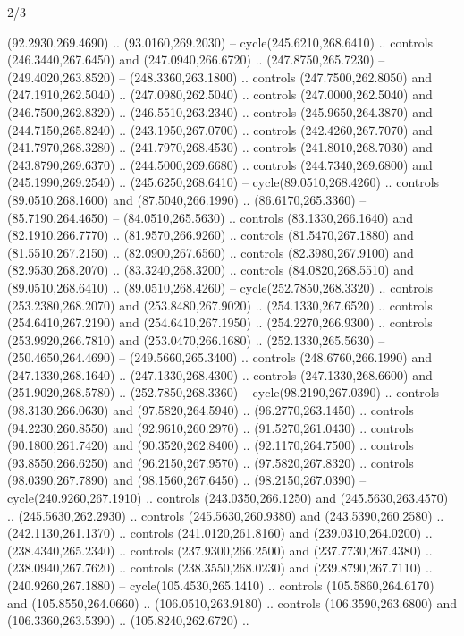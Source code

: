 \begin{flagdescription}{2/3}
\begin{scope}[xshift=0.5\flaglength,yshift=0.5\flagwidth,scale=\stretchfactor]
\begin{scope}[scale=0.001645\flagwidth,yshift=65mm,xshift=-63mm]
\begin{scope}[y=0.80pt, x=0.80pt, yscale=-1,]
\begin{scope}[cm={{1.33333,0.0,0.0,1.33333,(0.0,1e-05)}}]
  (92.2930,269.4690) .. (93.0160,269.2030) -- cycle(245.6210,268.6410) ..
  controls (246.3440,267.6450) and (247.0940,266.6720) .. (247.8750,265.7230) --
  (249.4020,263.8520) -- (248.3360,263.1800) .. controls (247.7500,262.8050) and
  (247.1910,262.5040) .. (247.0980,262.5040) .. controls (247.0000,262.5040) and
  (246.7500,262.8320) .. (246.5510,263.2340) .. controls (245.9650,264.3870) and
  (244.7150,265.8240) .. (243.1950,267.0700) .. controls (242.4260,267.7070) and
  (241.7970,268.3280) .. (241.7970,268.4530) .. controls (241.8010,268.7030) and
  (243.8790,269.6370) .. (244.5000,269.6680) .. controls (244.7340,269.6800) and
  (245.1990,269.2540) .. (245.6250,268.6410) -- cycle(89.0510,268.4260) ..
  controls (89.0510,268.1600) and (87.5040,266.1990) .. (86.6170,265.3360) --
  (85.7190,264.4650) -- (84.0510,265.5630) .. controls (83.1330,266.1640) and
  (82.1910,266.7770) .. (81.9570,266.9260) .. controls (81.5470,267.1880) and
  (81.5510,267.2150) .. (82.0900,267.6560) .. controls (82.3980,267.9100) and
  (82.9530,268.2070) .. (83.3240,268.3200) .. controls (84.0820,268.5510) and
  (89.0510,268.6410) .. (89.0510,268.4260) -- cycle(252.7850,268.3320) ..
  controls (253.2380,268.2070) and (253.8480,267.9020) .. (254.1330,267.6520) ..
  controls (254.6410,267.2190) and (254.6410,267.1950) .. (254.2270,266.9300) ..
  controls (253.9920,266.7810) and (253.0470,266.1680) .. (252.1330,265.5630) --
  (250.4650,264.4690) -- (249.5660,265.3400) .. controls (248.6760,266.1990) and
  (247.1330,268.1640) .. (247.1330,268.4300) .. controls (247.1330,268.6600) and
  (251.9020,268.5780) .. (252.7850,268.3360) -- cycle(98.2190,267.0390) ..
  controls (98.3130,266.0630) and (97.5820,264.5940) .. (96.2770,263.1450) ..
  controls (94.2230,260.8550) and (92.9610,260.2970) .. (91.5270,261.0430) ..
  controls (90.1800,261.7420) and (90.3520,262.8400) .. (92.1170,264.7500) ..
  controls (93.8550,266.6250) and (96.2150,267.9570) .. (97.5820,267.8320) ..
  controls (98.0390,267.7890) and (98.1560,267.6450) .. (98.2150,267.0390) --
  cycle(240.9260,267.1910) .. controls (243.0350,266.1250) and
  (245.5630,263.4570) .. (245.5630,262.2930) .. controls (245.5630,260.9380) and
  (243.5390,260.2580) .. (242.1130,261.1370) .. controls (241.0120,261.8160) and
  (239.0310,264.0200) .. (238.4340,265.2340) .. controls (237.9300,266.2500) and
  (237.7730,267.4380) .. (238.0940,267.7620) .. controls (238.3550,268.0230) and
  (239.8790,267.7110) .. (240.9260,267.1880) -- cycle(105.4530,265.1410) ..
  controls (105.5860,264.6170) and (105.8550,264.0660) .. (106.0510,263.9180) ..
  controls (106.3590,263.6800) and (106.3360,263.5390) .. (105.8240,262.6720) ..

\end{scope}
\end{scope}
\end{scope}
\end{scope}
\end{flagdescription}
